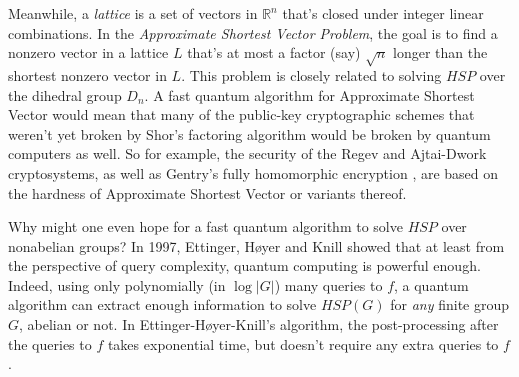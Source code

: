 \documentclass[11pt]{report}
\theoremstyle{plain}
\theoremstyle{definition}
\newcommand{\R}{{\mathbb R}}
\begin{document}
Meanwhile, a {\em lattice} is a set of vectors in $\R^n$ that's closed under integer linear combinations.  In the {\em Approximate Shortest Vector Problem}, the goal is to find a nonzero vector in a lattice $L$ that's at most a factor (say) $\sqrt{n}$ longer than the shortest nonzero vector in $L$.
This problem is closely related to solving $HSP$ over the dihedral group $D_n$.  A fast quantum algorithm for Approximate Shortest Vector would
mean that many of the public-key cryptographic schemes that weren't yet broken by Shor's factoring algorithm would be broken by quantum computers as well.
So for example, the security of the Regev and Ajtai-Dwork cryptosystems, as well as Gentry's fully homomorphic encryption \cite{gentry}, are based on the hardness of Approximate Shortest Vector or variants thereof.

Why might one even hope for a fast quantum algorithm to solve $HSP$ over nonabelian groups? In 1997, Ettinger, H\o yer and Knill \cite{ehk} showed that
at least from the perspective of query complexity, quantum computing is powerful enough. Indeed, using only polynomially
(in $\log \left|G\right|$) many queries to $f$, a quantum algorithm can extract enough information to solve $HSP(G)$ for {\em any} finite group $G$, abelian or not.
In Ettinger-H\o yer-Knill's algorithm, the post-processing after the queries to $f$ takes exponential time, but doesn't require any extra queries to $f$.
\end{document}
